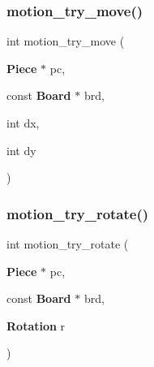 \subsubsection{motion\+\_\+try\+\_\+move()}
{\footnotesize\ttfamily int motion\+\_\+try\+\_\+move (\begin{DoxyParamCaption}\item[{\textbf{ Piece} $\ast$}]{pc,  }\item[{const \textbf{ Board} $\ast$}]{brd,  }\item[{int}]{dx,  }\item[{int}]{dy }\end{DoxyParamCaption})}

\mbox{\label{motion_8h_a89a0f1321575d3346ebd65f5e2953d71}} 
\subsubsection{motion\+\_\+try\+\_\+rotate()}
{\footnotesize\ttfamily int motion\+\_\+try\+\_\+rotate (\begin{DoxyParamCaption}\item[{\textbf{ Piece} $\ast$}]{pc,  }\item[{const \textbf{ Board} $\ast$}]{brd,  }\item[{\textbf{ Rotation}}]{r }\end{DoxyParamCaption})}

